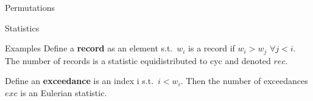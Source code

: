 \documentclass[12pt, letterpaper]{article}
\begin{document}
\begin{section}{Permutations}
\begin{subsection}{Statistics}
\begin{subsubsection}{Examples}
      Define a \textbf{record} as an element s.t.\ \(w_{i}\) is a record if
      \(w_{i} > w_{j}\) \(\forall j < i\). The number of records is a statistic
      equidistributed to cyc and denoted \(rec\).

      Define an \textbf{exceedance} is an index i s.t.\ \(i < w_{i}\). Then the
      number of exceedances \(exc\) is an Eulerian statistic.

    \end{subsubsection}

  \end{subsection}

\end{section}
\end{document}
